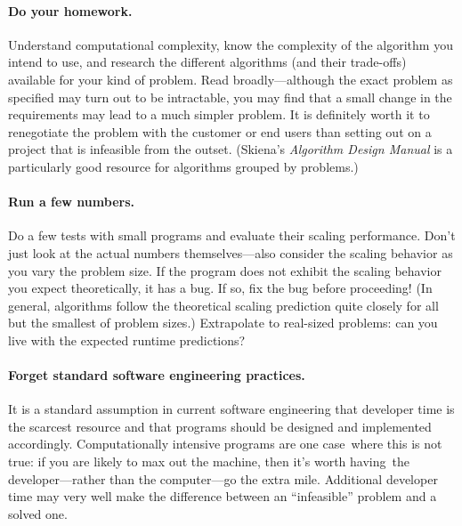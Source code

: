 \paragraph{Do your homework.}
Understand computational complexity, know the complexity of the
algorithm you intend to use, and research the different algorithms
(and their trade-offs) available for your kind of problem. Read
broadly---although the exact problem as specified may turn out to be
intractable, you may find that a small change in the requirements may
lead to a much simpler problem. It is definitely worth it to renegotiate
the problem with the customer or end users than setting out on a
project that is infeasible from the outset. (Skiena's \emph{Algorithm
  Design Manual} is a particularly good resource for algorithms
grouped by problems.)

\paragraph{Run a few numbers.}
Do a few tests with small programs and evaluate their scaling
performance. Don't just look at the actual numbers themselves---also
consider the scaling behavior as you vary the problem size.  If the
program does not exhibit the scaling behavior you expect
theoretically, it has a bug. If so, fix the bug before proceeding! (In
general, algorithms follow the theoretical scaling prediction quite
closely for all but the smallest of problem sizes.) Extrapolate to
real-sized problems: can you live with the expected runtime predictions?

\paragraph{Forget standard software engineering practices.}
It is a standard assumption in current software engineering that
developer time is the scarcest resource and that programs should be
designed and implemented accordingly. Computationally intensive
programs are one case~where this is not true: if you are likely to max
out the machine, then it's worth having~the developer---rather than
the computer---go the extra mile.  Additional developer time may very
well make the difference between an ``infeasible'' problem and a
solved one.


